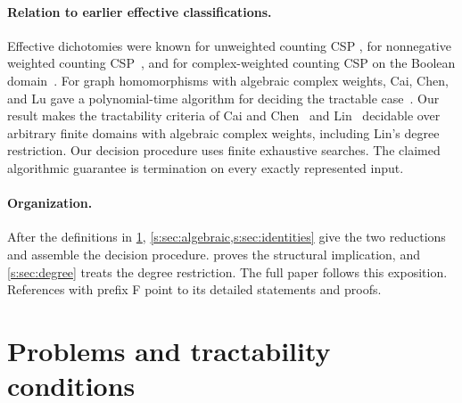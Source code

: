 \documentclass[11pt,letterpaper,onecolumn]{article}
\theoremstyle{plain}
\theoremstyle{definition}
\theoremstyle{remark}
\begin{document}
\paragraph{Relation to earlier effective classifications.}
Effective dichotomies were known for unweighted counting CSP
\cite{Bulatov2013,DyerRicherby2013}, for nonnegative weighted counting
CSP~\cite{CaiChenLu2016}, and for complex-weighted counting CSP on the
Boolean domain~\cite{CaiLuXia2014}. For graph homomorphisms with algebraic
complex weights, Cai, Chen, and Lu gave a polynomial-time algorithm for
deciding the tractable case~\cite[Theorem~1.2]{CaiChenLu2013}.
Our result makes the tractability criteria of Cai and
Chen~\cite{CaiChen2017} and Lin~\cite{Lin2021} decidable over arbitrary
finite domains with algebraic complex weights, including Lin's degree
restriction. Our decision procedure uses finite exhaustive
searches. The claimed algorithmic guarantee is termination on every
exactly represented input.

\paragraph{Organization.}
After the definitions in \cref{s:sec:preliminaries},
\cref{s:sec:algebraic,s:sec:identities} give the two reductions and
assemble the decision procedure.  proves the
structural implication, and \cref{s:sec:degree} treats the degree
restriction. The full paper follows this exposition. References with
prefix F point to its detailed statements and proofs.

\section{Problems and tractability conditions}
\label{s:sec:preliminaries}
\end{document}
